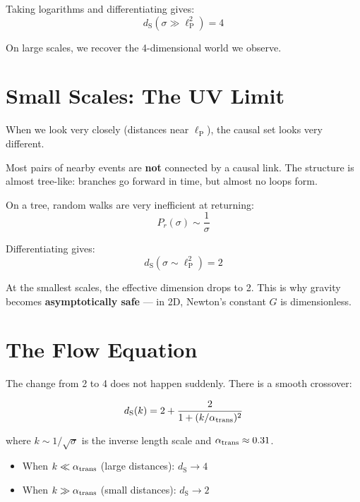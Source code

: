 \documentclass[11pt, a4paper, openany]{book}
\newcommand{\lP}{\ell_{\mathrm{P}}}
\newcommand{\dS}{d_{\mathrm{S}}}
\begin{document}
Taking logarithms and differentiating gives:
\begin{equation}
\dS(\sigma \gg \lP^2) = 4
\end{equation}

\begin{result}
On large scales, we recover the 4-dimensional world we observe.
\end{result}

\section{Small Scales: The UV Limit}

When we look very closely (distances near $\lP$), the causal set looks very different.

Most pairs of nearby events are \textbf{not} connected by a causal link.
The structure is almost tree-like: branches go forward in time, but almost no loops form.

On a tree, random walks are very inefficient at returning:
\begin{equation}
P_r(\sigma) \sim \frac{1}{\sigma}
\end{equation}

Differentiating gives:
\begin{equation}
\dS(\sigma \sim \lP^2) = 2
\end{equation}

\begin{result}
At the smallest scales, the effective dimension drops to 2. This is why gravity becomes \textbf{asymptotically safe} --- in 2D, Newton's constant $G$ is dimensionless.
\end{result}

\section{The Flow Equation}

The change from 2 to 4 does not happen suddenly.
There is a smooth crossover:

\begin{equation}
\dS(k) = 2 + \frac{2}{1 + (k / \alpha_{\rm trans})^2}
\end{equation}

where $k \sim 1/\sqrt{\sigma}$ is the inverse length scale and $\alpha_{\rm trans} \approx 0.31$.

\begin{itemize}
  \item When $k \ll \alpha_{\rm trans}$ (large distances): $\dS \to 4$
  \item When $k \gg \alpha_{\rm trans}$ (small distances): $\dS \to 2$
\end{itemize}
\end{document}
